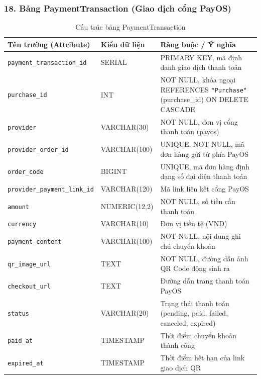 \documentclass[../DoAn.tex]{subfiles}
\begin{document}
\subsubsection*{18. Bảng PaymentTransaction (Giao dịch cổng PayOS)}
\begin{table}[H]
\centering
\footnotesize
\renewcommand{\arraystretch}{1.2}
\begin{tabular}{|p{4.2cm}|p{3.2cm}|p{7.1cm}|}
\hline
\textbf{Tên trường (Attribute)} & \textbf{Kiểu dữ liệu} & \textbf{Ràng buộc / Ý nghĩa} \\
\hline
\texttt{payment\_transaction\_id} & SERIAL & PRIMARY KEY, mã định danh giao dịch thanh toán \\
\hline
\texttt{purchase\_id} & INT & NOT NULL, khóa ngoại REFERENCES \texttt{"Purchase"}(purchase\_id) ON DELETE CASCADE \\
\hline
\texttt{provider} & VARCHAR(30) & NOT NULL, đơn vị cổng thanh toán (payos) \\
\hline
\texttt{provider\_order\_id} & VARCHAR(100) & UNIQUE, NOT NULL, mã đơn hàng gửi từ phía PayOS \\
\hline
\texttt{order\_code} & BIGINT & UNIQUE, mã đơn hàng định dạng số đại diện thanh toán \\
\hline
\texttt{provider\_payment\_link\_id} & VARCHAR(120) & Mã link liên kết cổng PayOS \\
\hline
\texttt{amount} & NUMERIC(12,2) & NOT NULL, số tiền cần thanh toán \\
\hline
\texttt{currency} & VARCHAR(10) & Đơn vị tiền tệ (VND) \\
\hline
\texttt{payment\_content} & VARCHAR(100) & NOT NULL, nội dung ghi chú chuyển khoản \\
\hline
\texttt{qr\_image\_url} & TEXT & NOT NULL, đường dẫn ảnh QR Code động sinh ra \\
\hline
\texttt{checkout\_url} & TEXT & Đường dẫn trang thanh toán PayOS \\
\hline
\texttt{status} & VARCHAR(20) & Trạng thái thanh toán (pending, paid, failed, canceled, expired) \\
\hline
\texttt{paid\_at} & TIMESTAMP & Thời điểm chuyển khoản thành công \\
\hline
\texttt{expired\_at} & TIMESTAMP & Thời điểm hết hạn của link giao dịch QR \\
\hline
\end{tabular}
\caption{Cấu trúc bảng PaymentTransaction}
\label{tab:schema_paymenttransaction}
\end{table}
\end{document}
